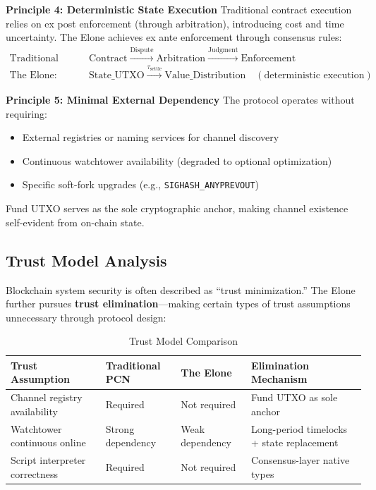 \documentclass[11pt,a4paper]{article}
\begin{document}
\textbf{Principle 4: Deterministic State Execution}
Traditional contract execution relies on ex post enforcement (through arbitration), introducing cost and time uncertainty. The Elone achieves ex ante enforcement through consensus rules:
\begin{align*}
\text{Traditional Mode: } & \text{Contract} \xrightarrow{\text{Dispute}} \text{Arbitration} \xrightarrow{\text{Judgment}} \text{Enforcement} \\
\text{The Elone: } & \text{State\_UTXO} \xrightarrow{\tau_{\text{settle}}} \text{Value\_Distribution} \quad (\text{deterministic execution})
\end{align*}

\textbf{Principle 5: Minimal External Dependency}
The protocol operates without requiring:
\begin{itemize}
    \item External registries or naming services for channel discovery
    \item Continuous watchtower availability (degraded to optional optimization)
    \item Specific soft-fork upgrades (e.g., \texttt{SIGHASH\_ANYPREVOUT})
\end{itemize}

Fund UTXO serves as the sole cryptographic anchor, making channel existence self-evident from on-chain state.

\subsection{Trust Model Analysis}

Blockchain system security is often described as ``trust minimization.'' The Elone further pursues \textbf{trust elimination}---making certain types of trust assumptions unnecessary through protocol design:

\begin{table}[htbp]
\centering
\small
\caption{Trust Model Comparison}
\begin{tabular}{@{}p{4cm}p{2.5cm}p{2.8cm}p{3.5cm}@{}}
\toprule
\textbf{Trust Assumption} & \textbf{Traditional PCN} & \textbf{The Elone} & \textbf{Elimination Mechanism} \\
\midrule
Channel registry availability & Required & Not required & Fund UTXO as sole anchor \\
Watchtower continuous online & Strong dependency & Weak dependency & Long-period timelocks + state replacement \\
Script interpreter correctness & Required & Not required & Consensus-layer native types \\
\bottomrule
\end{tabular}
\end{table}
\end{document}
